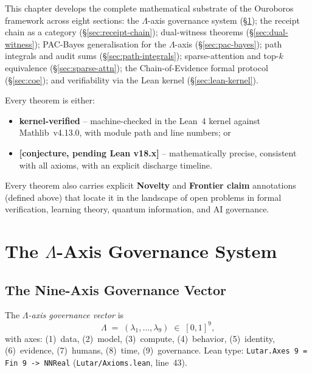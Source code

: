 This chapter develops the complete mathematical substrate of the
Ouroboros framework across eight sections:
the $\Lambda$-axis governance system (\S\ref{sec:lambda-axis});
the receipt chain as a category (\S\ref{sec:receipt-chain});
dual-witness theorems (\S\ref{sec:dual-witness});
PAC-Bayes generalisation for the $\Lambda$-axis (\S\ref{sec:pac-bayes});
path integrals and audit sums (\S\ref{sec:path-integrals});
sparse-attention and top-$k$ equivalence (\S\ref{sec:sparse-attn});
the Chain-of-Evidence formal protocol (\S\ref{sec:coe});
and verifiability via the Lean kernel (\S\ref{sec:lean-kernel}).

Every theorem is either:
\begin{itemize}
  \item \textbf{kernel-verified} -- machine-checked in the Lean~4 kernel
        against Mathlib~v4.13.0, with module path and line numbers; or
  \item \textbf{[conjecture, pending Lean v18.x]} -- mathematically precise,
        consistent with all axioms, with an explicit discharge timeline.
\end{itemize}

\noindent
Every theorem also carries explicit \textbf{Novelty} and
\textbf{Frontier claim} annotations (defined above) that locate it in the
landscape of open problems in formal verification, learning theory,
quantum information, and AI governance.

\section{The \texorpdfstring{$\Lambda$}{Lambda}-Axis Governance System}
\label{sec:lambda-axis}

\subsection{The Nine-Axis Governance Vector}
\label{subsec:nine-axes}

\begin{definition}
\label{def:lambda-vector}
The \emph{$\Lambda$-axis governance vector} is
\begin{equation}
  \Lambda \;=\; (\lambda_1,\ldots,\lambda_9) \;\in\; [0,1]^9,
  \label{eq:lambda-vector}
\end{equation}
with axes: (1)~data, (2)~model, (3)~compute, (4)~behavior,
(5)~identity, (6)~evidence, (7)~humans, (8)~time, (9)~governance.
\textup{Lean type:} \texttt{Lutar.Axes~9 = Fin~9 -> NNReal}
(\texttt{Lutar/Axioms.lean}, line~43).
\end{definition}

